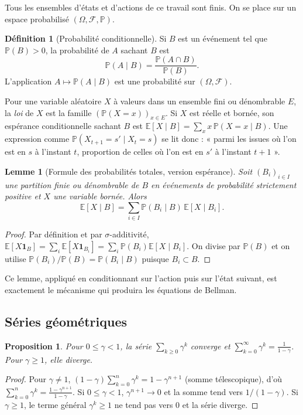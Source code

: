 \documentclass[11pt,a4paper]{article}
\theoremstyle{plain}
\newtheorem{proposition}[theoreme]{Proposition}
\newtheorem{lemme}[theoreme]{Lemme}
\theoremstyle{definition}
\newtheorem{definition}[theoreme]{Définition}
\theoremstyle{remark}
\newcommand{\E}{\mathbb{E}}
\renewcommand{\P}{\mathbb{P}}
\newcommand{\cF}{\mathcal{F}}
\newcommand{\1}{\mathbf{1}}
\begin{document}
Tous les ensembles d'états et d'actions de ce travail sont finis. On se place sur un espace probabilisé $(\Omega,\cF,\P)$.

\begin{definition}[Probabilité conditionnelle]
Si $B$ est un événement tel que $\P(B)>0$, la probabilité de $A$ sachant $B$ est
\[
\P(A\mid B)=\frac{\P(A\cap B)}{\P(B)}.
\]
L'application $A\mapsto\P(A\mid B)$ est une probabilité sur $(\Omega,\cF)$.
\end{definition}

Pour une variable aléatoire $X$ à valeurs dans un ensemble fini ou dénombrable $E$, la \emph{loi} de $X$ est la famille $(\P(X=x))_{x\in E}$. Si $X$ est réelle et bornée, son espérance conditionnelle sachant $B$ est $\E[X\mid B]=\sum_x x\,\P(X=x\mid B)$. Une expression comme $\P(X_{t+1}=s'\mid X_t=s)$ se lit donc : « parmi les issues où l'on est en $s$ à l'instant $t$, proportion de celles où l'on est en $s'$ à l'instant $t+1$ ».

\begin{lemme}[Formule des probabilités totales, version espérance]\label{lem-totale}
Soit $(B_i)_{i\in I}$ une partition finie ou dénombrable de $B$ en événements de probabilité strictement positive et $X$ une variable bornée. Alors
\[
\E[X\mid B]=\sum_{i\in I}\P(B_i\mid B)\,\E[X\mid B_i].
\]
\end{lemme}
\begin{proof}
Par définition et par $\sigma$-additivité, $\E[X\1_B]=\sum_i\E[X\1_{B_i}]=\sum_i\P(B_i)\E[X\mid B_i]$. On divise par $\P(B)$ et on utilise $\P(B_i)/\P(B)=\P(B_i\mid B)$ puisque $B_i\subset B$.
\end{proof}

Ce lemme, appliqué en conditionnant sur l'action puis sur l'état suivant, est exactement le mécanisme qui produira les équations de Bellman.

\subsection{Séries géométriques}

\begin{proposition}\label{prop-geom}
Pour $0\le\gamma<1$, la série $\sum_{k\ge0}\gamma^k$ converge et $\sum_{k=0}^\infty\gamma^k=\frac{1}{1-\gamma}$. Pour $\gamma\ge1$, elle diverge.
\end{proposition}
\begin{proof}
Pour $\gamma\ne1$, $(1-\gamma)\sum_{k=0}^{n}\gamma^k=1-\gamma^{n+1}$ (somme télescopique), d'où $\sum_{k=0}^{n}\gamma^k=\frac{1-\gamma^{n+1}}{1-\gamma}$. Si $0\le\gamma<1$, $\gamma^{n+1}\to0$ et la somme tend vers $1/(1-\gamma)$. Si $\gamma\ge1$, le terme général $\gamma^k\ge1$ ne tend pas vers $0$ et la série diverge.
\end{proof}
\end{document}
